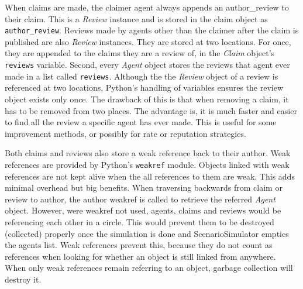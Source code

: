 \documentclass[%
    ]{\PathToTumTemplate/thesis/tum_thesis}
\begin{document}
When claims are made, the claimer agent always appends an \gls{author_review} to their claim.
This is a \emph{Review} instance and is stored in the claim object as \texttt{author\_review}.
Reviews made by agents other than the claimer after the claim is published are also \emph{Review} instances.
They are stored at two locations.
For once, they are appended to the claims they are a review of, in the \emph{Claim} object's \texttt{reviews} variable.
Second, every \emph{Agent} object stores the reviews that agent ever made in a list called \texttt{reviews}.
Although the the \emph{Review} object of a review is referenced at two locations, Python's handling of variables ensures the review object exists only once.
The drawback of this is that when removing a claim, it has to be removed from two places.
The advantage is, it is much faster and easier to find all the review a specific agent has ever made.
This is useful for some improvement methods, or possibly for rate or reputation strategies.

Both claims and reviews also store a weak reference back to their author.
Weak references are provided by Python's \texttt{weakref} module.
Objects linked with weak references are not kept alive when the all references to them are weak.
This adds minimal overhead but big benefits.
When traversing backwards from claim or review to author, the author weakref is called to retrieve the referred \emph{Agent} object.
However, were weakref not used, agents, claims and reviews would be referencing each other in a circle.
This would prevent them to be destroyed (collected) properly once the simulation is done and ScenarioSimulator empties the agents list.
Weak references prevent this, because they do not count as references when looking for whether an object is still linked from anywhere.
When only weak references remain referring to an object, garbage collection will destroy it.
\end{document}

